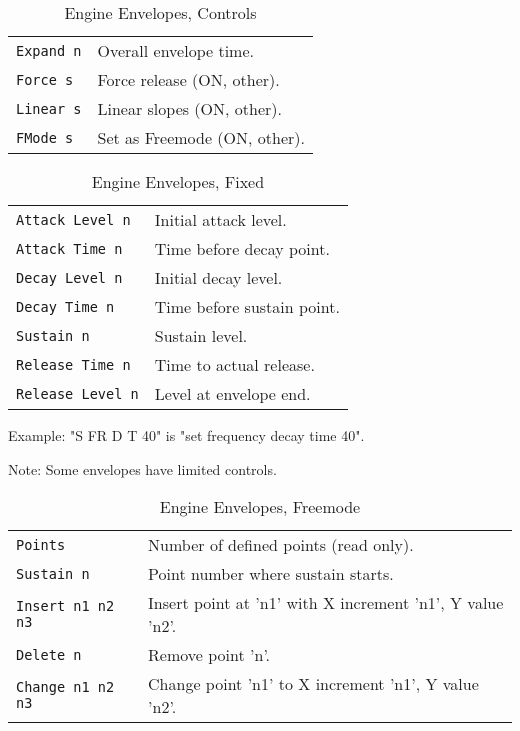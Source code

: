    \begin{table}[H]
      \centering
      \caption{Engine Envelopes, Controls}
      \label{table:yoshimi_engine_envelopes_controls}
      \begin{tabular}{l l}

\texttt{Expand n} &
   Overall envelope time. \\
\texttt{Force s} &
   Force release (ON, other). \\
\texttt{Linear s} &
   Linear slopes (ON, other). \\
\texttt{FMode s} &
   Set as Freemode (ON, other). \\

      \end{tabular}
   \end{table}

   \begin{table}[H]
      \centering
      \caption{Engine Envelopes, Fixed}
      \label{table:yoshimi_engine_envelopes_fixed}
      \begin{tabular}{l l}

\texttt{Attack Level n} &
   Initial attack level. \\
\texttt{Attack Time n} &
   Time before decay point. \\
\texttt{Decay Level n} &
   Initial decay level. \\
\texttt{Decay Time n} &
   Time before sustain point. \\
\texttt{Sustain n} &
   Sustain level. \\
\texttt{Release Time n} &
   Time to actual release. \\
\texttt{Release Level n} &
   Level at envelope end. \\

      \end{tabular}
   \end{table}

Example: "S FR D T 40" is "set frequency decay time 40".

Note: Some envelopes have limited controls.

   \begin{table}[H]
      \centering
      \caption{Engine Envelopes, Freemode}
      \label{table:yoshimi_engine_envelopes_freemode}
      \begin{tabular}{l l}

\texttt{Points} &
   Number of defined points (read only). \\
\texttt{Sustain n} &
   Point number where sustain starts. \\
\texttt{Insert n1 n2 n3} &
   Insert point at 'n1' with X increment 'n1', Y value 'n2'. \\
\texttt{Delete n} &
   Remove point 'n'. \\
\texttt{Change n1 n2 n3} &
   Change point 'n1' to X increment 'n1', Y value 'n2'. \\

      \end{tabular}
   \end{table}

